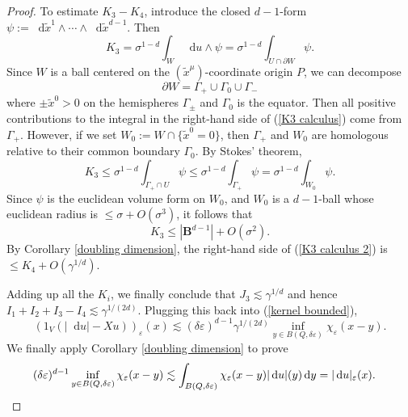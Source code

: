 \documentclass[reqno,11pt]{amsart}
\newcommand{\Ball}{\mathbf{B}}
\newcommand*\dif{\mathop{}\!\mathrm{d}}
\theoremstyle{definition}
\numberwithin{equation}{section}
\begin{document}
\begin{proof}
To estimate $K_3 - K_4$, introduce the closed $d-1$-form $\psi := \dif \tilde x^1 \wedge \cdots \wedge \dif \tilde x^{d - 1}$.
Then
\begin{equation}\label{K3 calculus}
K_3 = \sigma^{1 - d} \int_W \dif u \wedge \psi = \sigma^{1 - d} \int_{U \cap \partial W} \psi.
\end{equation}
Since $W$ is a ball centered on the $(\tilde x^\mu)$-coordinate origin $P$, we can decompose
$$\partial W = \Gamma_+ \cup \Gamma_0 \cup \Gamma_-$$
where $\pm \tilde x^0 > 0$ on the hemispheres $\Gamma_\pm$ and $\Gamma_0$ is the equator.
Then all positive contributions to the integral in the right-hand side of (\ref{K3 calculus}) come from $\Gamma_+$.
However, if we set $W_0 := W \cap \{\tilde x^0 = 0\}$, then $\Gamma_+$ and $W_0$ are homologous relative to their common boundary $\Gamma_0$.
By Stokes' theorem,
$$K_3 \leq \sigma^{1 - d} \int_{\Gamma_+ \cap U} \psi \leq \sigma^{1 - d} \int_{\Gamma_+} \psi = \sigma^{1 - d} \int_{W_0} \psi.$$
Since $\psi$ is the euclidean volume form on $W_0$, and $W_0$ is a $d-1$-ball whose euclidean radius is $\leq \sigma + O(\sigma^3)$, it follows that
\begin{equation}\label{K3 calculus 2}
K_3 \leq |\Ball^{d - 1}| + O(\sigma^2).
\end{equation}
By Corollary \ref{doubling dimension}, the right-hand side of (\ref{K3 calculus 2}) is $\leq K_4 + O(\gamma^{1/d})$.

Adding up all the $K_i$, we finally conclude that $J_3 \lesssim \gamma^{1/d}$ and hence $I_1 + I_2 + I_3 - I_4 \lesssim \gamma^{1/(2d)}$.
Plugging this back into (\ref{kernel bounded}),
$$(1_V(|\dif u| - X u))_\varepsilon(x) \lesssim (\delta\varepsilon)^{d - 1} \gamma^{1/(2d)} \inf_{y \in B(Q, \delta\varepsilon)} \chi_\varepsilon(x - y).$$
We finally apply Corollary \ref{doubling dimension} to prove
\begin{align*}
(\delta\varepsilon)^{d - 1} \inf_{y \in B(Q, \delta\varepsilon)} \chi_\varepsilon(x - y)
&\lesssim \int_{B(Q, \delta \varepsilon)} \chi_\varepsilon(x - y) |\dif u|(y) \dif y = |\dif u|_\varepsilon(x). \qedhere
\end{align*}
\end{proof}
\end{document}
